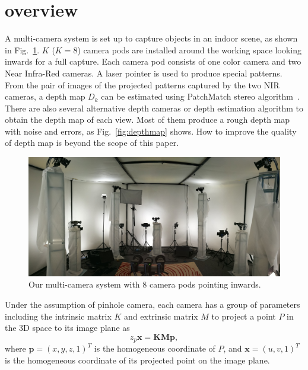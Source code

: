 \section{overview}
\label{sec:overview}



A multi-camera system is set up to capture objects in an indoor scene, as shown in Fig.~\ref{fig:rig}. 
%
$K$ ($K=8$) camera pods are installed around the working space looking inwards for a full capture. 
Each camera pod consists of one color camera and two Near Infra-Red cameras. A laser pointer is used to produce special patterns. From the pair of images of the projected patterns captured by the two NIR cameras, a depth map $D_k$ can be estimated using PatchMatch stereo algorithm~\cite{Bleyer2011PatchMatch}.
There are also several alternative depth cameras or depth estimation algorithm to obtain the depth map of each view. Most of them produce a rough depth map with noise and errors, as Fig.~\ref{fig:depthmap} shows.
How to improve the quality of depth map is beyond the scope of this paper. 

\begin{figure}
	\centering
	\includegraphics[width=\columnwidth]{image/rig.jpg}
	\caption{Our multi-camera system with 8 camera pods pointing inwards.}
	\label{fig:rig}
\end{figure}


%
Under the assumption of pinhole camera, each camera has a group of parameters including the intrinsic matrix $K$ and extrinsic matrix $M$ to project a point $P$ in the 3D space to its image plane as 
\begin{equation}\label{eq:cam-proj}
z_{p}\mathbf{x}=\mathbf{K}\mathbf{M}\mathbf{p},
\end{equation}
where $\mathbf{p}=(x,y,z,1)^{T}$ is the homogeneous coordinate of $P$, and $\mathbf{x}=(u,v,1)^{T}$ is the homogeneous coordinate of its projected point on the image plane. 
%

